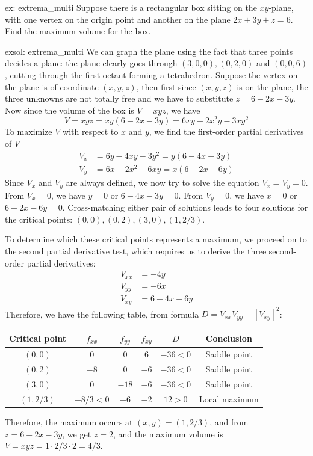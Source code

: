 \begin{ex}[]{ex: extrema_multi}
    Suppose there is a rectangular box sitting on the $xy$-plane, with one vertex on the origin point and another on the plane $2x+3y+z = 6$.  Find the maximum volume for the box.
\end{ex}

\begin{exsol}[]{exsol: extrema_multi}
    We can graph the plane using the fact that three points decides a plane: the plane clearly goes through $(3,0,0), (0,2,0)$ and $(0,0,6)$, cutting through the first octant forming a tetrahedron.  Suppose the vertex on the plane is of coordinate $(x,y,z)$, then first since $(x,y,z)$ is on the plane, the three unknowns are not totally free and we have to substitute $z = 6-2x-3y$.  Now since the volume of the box is $V = xyz$, we have
    \[V = xyz = xy(6-2x-3y) = 6xy - 2x^2y-3xy^2\]
    To maximize $V$ with respect to $x$ and $y$, we find the first-order partial derivatives of $V$
    \begin{align*}
        V_x &= 6y - 4xy - 3y^2 = y(6-4x-3y)\\
        V_y &= 6x - 2x^2 - 6xy = x(6-2x-6y)
    \end{align*}
    Since $V_x$ and $V_y$ are always defined, we now try to solve the equation $V_x = V_y = 0$.  From $V_x = 0$, we have $y = 0$ or $6-4x-3y = 0$.  From $V_y = 0$, we have $x = 0$ or $6-2x-6y=0$.  Cross-matching either pair of solutions leads to four solutions for the critical points: $(0, 0), (0, 2), (3, 0), (1, 2/3)$.  

    To determine which these critical points represents a maximum, we proceed on to the second partial derivative test, which requires us to derive the three second-order partial derivatives:
    \begin{align*}
        V_{xx} &= -4y\\
        V_{yy} &= -6x\\
        V_{xy} &= 6-4x-6y
    \end{align*}
    Therefore, we have the following table, from formula $D = V_{xx}V_{yy}-[V_{xy}]^2$:
    \begin{center}
        \begin{tabular}[ht]{cccccc}
            Critical point & $f_{xx}$ & $f_{yy}$ & $f_{xy}$ & $D$ & Conclusion\\
            \hline
            $(0,0)$ & $0$ & $0$ & $6$ & $-36<0$ & Saddle point\\
            $(0,2)$ & $-8$ & $0$ & $-6$ & $-36<0$ & Saddle point\\
            $(3,0)$ & $0$ & $-18$ & $-6$ & $-36<0$ & Saddle point\\
            $(1,2/3)$ & $-8/3 < 0$ & $-6$ & $-2$ & $12>0$ & Local maximum
        \end{tabular}
    \end{center}
    Therefore, the maximum occurs at $(x,y) = (1,2/3)$, and from $z=6-2x-3y$, we get $z = 2$, and the maximum volume is $V = xyz = 1 \cdot 2/3 \cdot 2 = 4/3$.
\end{exsol}

